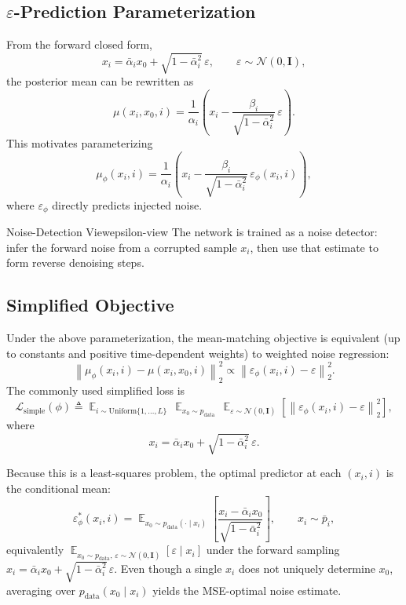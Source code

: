 \documentclass[11pt,a4paper]{article}
\DeclareMathOperator*{\E}{\mathbb{E}}
\newcommand{\cN}{\mathcal{N}}
\newcommand{\balpha}{\bar{\alpha}}
\newcommand{\pdata}{p_{\mathrm{data}}}
\newcommand{\Lsimple}{\mathcal{L}_{\text{simple}}}
\newcommand{\bpMarg}[1]{\bar p_{#1}}
\begin{document}
\subsection{\texorpdfstring{$\varepsilon$}{epsilon}-Prediction Parameterization}

From the forward closed form,
\[
x_i=\balpha_i x_0+\sqrt{1-\balpha_i^2}\,\varepsilon,\qquad
\varepsilon\sim\cN(0,\mathbf{I}),
\]
the posterior mean can be rewritten as
\[
\mu(x_i,x_0,i)
=\frac{1}{\alpha_i}\!\left(
x_i-\frac{\beta_i}{\sqrt{1-\balpha_i^2}}\,\varepsilon
\right).
\]
This motivates parameterizing
\[
\mu_\phi(x_i,i)
=\frac{1}{\alpha_i}\!\left(
x_i-\frac{\beta_i}{\sqrt{1-\balpha_i^2}}\,\varepsilon_\phi(x_i,i)
\right),
\]
where $\varepsilon_\phi$ directly predicts injected noise.

\begin{remark}{Noise-Detection View}{epsilon-view}
The network is trained as a noise detector: infer the forward noise from a corrupted sample $x_i$, then use that estimate to form reverse denoising steps.
\end{remark}

\subsection{Simplified Objective}

Under the above parameterization, the mean-matching objective is equivalent (up to constants and positive time-dependent weights) to weighted noise regression:
\[
\left\|
\mu_\phi(x_i,i)-\mu(x_i,x_0,i)
\right\|_2^2
\propto
\left\|
\varepsilon_\phi(x_i,i)-\varepsilon
\right\|_2^2.
\]
The commonly used simplified loss is
\[
\Lsimple(\phi)
\triangleq
\E_{i\sim\mathrm{Uniform}\{1,\dots,L\}}\,\E_{x_0\sim\pdata}\,\E_{\varepsilon\sim\cN(0,\mathbf{I})}
\!\left[
\left\|
\varepsilon_\phi(x_i,i)-\varepsilon
\right\|_2^2
\right],
\]
where
\[
x_i=\balpha_i x_0+\sqrt{1-\balpha_i^2}\,\varepsilon.
\]

Because this is a least-squares problem, the optimal predictor at each $(x_i,i)$ is the conditional mean:
\[
\varepsilon_\phi^{*}(x_i,i)
=\E_{x_0\sim \pdata(\cdot\mid x_i)}\!\left[\frac{x_i-\balpha_i x_0}{\sqrt{1-\balpha_i^2}}\right],
\qquad x_i\sim \bpMarg{i},
\]
equivalently $\E_{x_0\sim\pdata,\,\varepsilon\sim\cN(0,\mathbf{I})}[\varepsilon\mid x_i]$ under the forward sampling
$x_i=\balpha_i x_0+\sqrt{1-\balpha_i^2}\,\varepsilon$.
Even though a single $x_i$ does not uniquely determine $x_0$, averaging over $\pdata(x_0\mid x_i)$ yields the MSE-optimal noise estimate.
\end{document}

